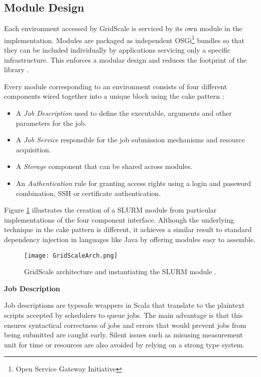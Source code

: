 \subsection{Module Design}

Each environment accessed by GridScale is serviced by its own module in the implementation. Modules are packaged as independent OSGi\footnote{Open Service Gateway Initiative} \cite{OSGi} bundles so that they can be included individually by applications servicing only a specific infrastructure. This enforces a modular design and reduces the footprint of the library \cite{Reuillon2016}.

Every module corresponding to an environment consists of four different components wired together into a unique block using the cake pattern \cite{Cake}:

\begin{itemize}
	\item A \textit{Job Description} used to define the executable, arguments and other parameters for the job.
	\item A \textit{Job Service} responsible for the job submission mechanisms and resource acquisition.
	\item A \textit{Storage} component that can be shared across modules.
	\item An \textit{Authentication} rule for granting access rights using a login and password combination, SSH or certificate authentication.
\end{itemize}

Figure \ref{GridScaleArch} illustrates the creation of a SLURM module from particular implementations of the four component interface. Although the underlying technique in the cake pattern is different, it achieves a similar result to standard dependency injection in languages like Java by offering modules easy to assemble.

\begin{figure}[h]
	\centering
		\texttt{[image: GridScaleArch.png]}
	\caption{GridScale architecture and instantiating the SLURM module \cite{Reuillon2016}.}
	\label{GridScaleArch}
\end{figure}

\vspace{4mm}
\textbf{Job Description}
\vspace{1mm}

Job descriptions are typesafe wrappers in Scala that translate to the plaintext scripts accepted by schedulers to queue jobs. The main advantage is that this ensures syntactical correctness of jobs and errors that would prevent jobs from being submitted are caught early. Silent issues such as misusing measurement unit for time or resources are also avoided by relying on a strong type system. 

